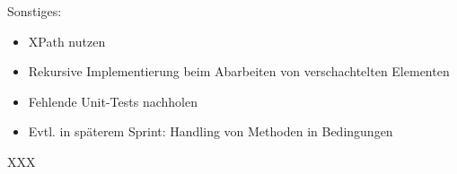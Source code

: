 Sonstiges:
\begin{itemize}
\item XPath nutzen
\item Rekursive Implementierung beim Abarbeiten von verschachtelten Elementen
\item Fehlende Unit-Tests nachholen
\item Evtl. in späterem Sprint: Handling von Methoden in Bedingungen
\end{itemize}
\nsecend%


\nsecend%

XXX
\nsecend%


\nsecend%